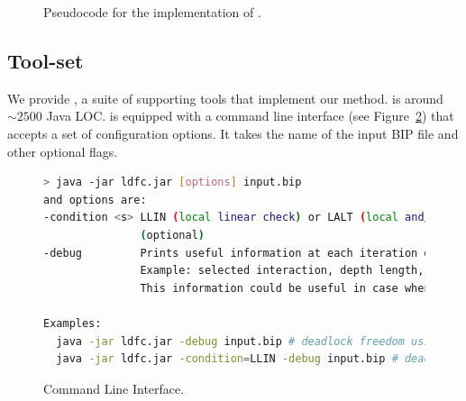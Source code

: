 \begin{figure}
\begin{tabbing}
%


\end{tabbing}

\caption{Pseudocode for the implementation of \LAO.}
\label{fig:impl.locANDOR}
\end{figure}







   \subsection{Tool-set}
   \label{s:tools}
%   


%
We provide \deadlocktool{}, a suite of supporting tools that implement our method. \deadlocktool{} is around $\sim 2500$ Java LOC.
%
\deadlocktool{} is equipped with a command line interface (see Figure~\ref{code:cmd-ldfc}) that accepts a set 
of configuration options. 
It takes the name of the input BIP file and other optional flags. 

\begin{figure}
\begin{lstlisting}[language=Bash]
> java -jar ldfc.jar [options] input.bip 
and options are:
-condition <s> LLIN (local linear check) or LALT (local and/or check - default)
               (optional)
-debug         Prints useful information at each iteration of checking. 
               Example: selected interaction, depth length, etc.
               This information could be useful in case when the condition fails.

Examples:
  java -jar ldfc.jar -debug input.bip # deadlock freedom using default LALT
  java -jar ldfc.jar -condition=LLIN -debug input.bip # deadlock freedom using LLIN
\end{lstlisting}
\caption{\deadlocktool{} Command Line Interface.}
\label{code:cmd-ldfc}
\end{figure}




